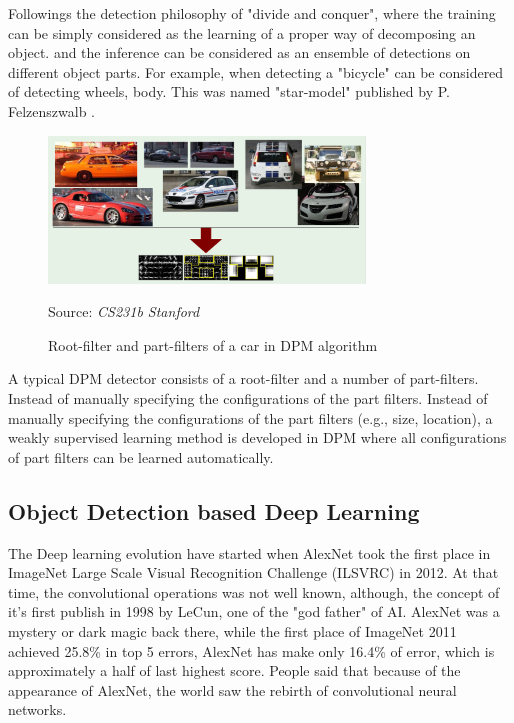 \documentclass[12pt]{article}
\newcommand{\source}[1]{\caption*{Source: \emph{#1}} }
\begin{document}
Followings the detection philosophy of "divide and conquer", where the training can 
be simply considered as the learning of a proper way of decomposing an object. 
and the inference can be considered as an ensemble of detections on different object 
parts. For example, when detecting a "bicycle" can be considered of detecting wheels, 
body. This was named "star-model" published by P. Felzenszwalb \cite{felzenszwalb2008discriminatively}.

\begin{figure}[htp]
    \centering
    \includegraphics[width=0.75\textwidth]{images/dpm.png}
    \caption{Root-filter and part-filters of a car in DPM algorithm}
    \label{fig:dpm}
    \source{CS231b Stanford}
\end{figure}

A typical DPM detector consists of a root-filter and a number of part-filters. Instead 
of manually specifying the configurations of the part filters. Instead of manually 
specifying the configurations of the part filters (e.g., size, location), a weakly supervised 
learning method is developed in DPM where all configurations of part filters can be 
learned automatically.

\subsection{Object Detection based Deep Learning}
\label{sec:deep_learning}
The Deep learning evolution have started when AlexNet\cite{krizhevsky2012imagenet} took the first place in 
ImageNet Large Scale Visual Recognition Challenge (ILSVRC) in 2012. At that time, 
the convolutional operations was not well known, although, the concept of it's 
first publish in 1998 by LeCun, one of the "god father" of AI. AlexNet was a 
mystery or dark magic back there, while the first place of ImageNet 2011 achieved 
25.8\% in top 5 errors, AlexNet has make only 16.4\% of error, which is approximately 
a half of last highest score. People said that because of the appearance of AlexNet, the 
world saw the rebirth of convolutional neural networks. 
\end{document}
